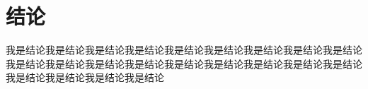 \chapter{结论}
我是结论我是结论我是结论我是结论我是结论我是结论我是结论我是结论我是结论我是结论我是结论我是结论我是结论我是结论我是结论我是结论我是结论我是结论我是结论我是结论我是结论我是结论